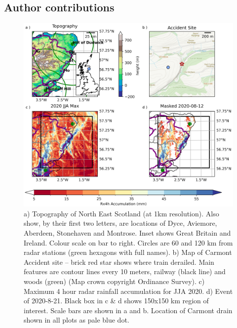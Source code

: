 \documentclass[11pt,a4paper]{article}
\begin{document}
\subsection*{Author contributions}
\FloatBarrier





\afterpage{\FloatBarrier}

\begin{figure}[tp]
	
	\centering
	\includegraphics[width=\linewidth]{carmont_geog_group}
	\caption{a) Topography of North East Scotland (at 1km resolution). Also show, by their first two letters, are locations of Dyce, Aviemore, Aberdeen, Stonehaven and Montrose. Inset shows Great Britain and Ireland. Colour scale on bar to right. Circles are  60 and 120 km from radar stations (green hexagons with full names). b)  Map of Carmont Accident site -- brick red star shows where train derailed. Main features are contour lines every 10 meters, railway (black line) and woods (green) (Map crown copyright Ordinance Survey).  c) Maximum 4 hour radar rainfall accumulation  for JJA 2020. d) Event of 2020-8-21.  Black box in c \& d shows 150x150 km region of interest. Scale bars are shown in a and b. Location of Carmont drain shown in all plots as pale blue dot.  }
	\label{fig:carmont_geog_group}
\end{figure}
\end{document}
